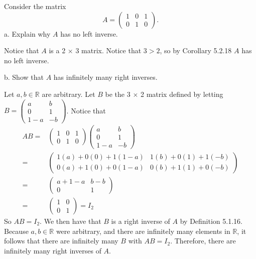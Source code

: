 \documentclass[12pt]{article}
\newenvironment{problem}[2][Problem]
{
	\begin{trivlist} 
		\item[\hskip \labelsep {\bfseries #1 #2:}]
	}
{
	\end{trivlist}
	}
\newenvironment{solution}[1][Solution]
{
	\begin{trivlist} 
		\item[\hskip \labelsep {\itshape #1:}]
	}
	{
	\end{trivlist}
}
\begin{document}
\newpage
\begin{problem}{5}
Consider the matrix
\[
A=\begin{pmatrix} 1&0&1\\0&1&0 \end{pmatrix}\text{.}
\]
\noindent
\newline
\newline
a. Explain why $A$ has no left inverse.
\begin{solution}
Notice that $A$ is a 2 $\times$ 3 matrix. Notice that $3>2$, so by Corollary 5.2.18 $A$ has no left inverse.
\end{solution}
%
\noindent
\newline
\newline
b. Show that $A$ has infinitely many right inverses.
\begin{solution}
Let $a,b \in \mathbb{R}$ are arbitrary. Let $B$ be the 3 $\times$ 2 matrix defined by letting $B=\begin{pmatrix}a&b\\0&1\\1-a&-b\end{pmatrix}$. Notice that
\begin{align*}
AB =& \begin{pmatrix} 1&0&1\\0&1&0 \end{pmatrix} \begin{pmatrix}a&b\\0&1\\1-a&-b\end{pmatrix}\\
=&\begin{pmatrix}1(a)+0(0)+1(1-a)&1(b)+0(1)+1(-b)\\0(a)+1(0)+0(1-a)&0(b)+1(1)+0(-b) \end{pmatrix}\\
=& \begin{pmatrix}a+1-a&b-b\\0&1 \end{pmatrix}\\
=&\begin{pmatrix}1&0\\0&1\end{pmatrix} = I_2
\end{align*}
So $AB = I_2$. We then have that $B$ is a right inverse of $A$ by Definition 5.1.16. Because $a,b \in \mathbb{R}$ were arbitrary, and there are infinitely many elements in $\mathbb{R}$, it follows that there are infinitely many $B$ with $AB=I_2$. Therefore, there are infinitely many right inverses of $A$.

\end{solution}
\end{problem}
\end{document}
